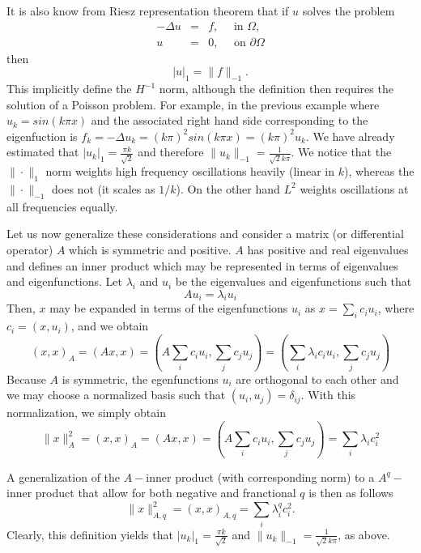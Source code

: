 It is also know from Riesz representation theorem that if
$u$ solves the problem
\begin{eqnarray*}
-\Delta u &=& f, \quad \mbox{ in } \Omega, \\   
        u &=& 0, \quad \mbox{ on } \partial \Omega  
\end{eqnarray*}
then 
\begin{equation}
\label{riesz}
|u|_1 = \|f\|_{-1} . 
\end{equation}
This implicitly define the $H^{-1}$ norm, although
the definition then requires the solution of a Poisson problem.   
For example, in the previous example where
$u_k = sin(k\pi x)$
and the associated right hand side corresponding to the eigenfuction is  $f_k = -\Delta u_k = (k \pi)^2 sin(k\pi x) = (k \pi)^2 u_k $. 
We  have already estimated  
that $|u_k|_1 = \frac{\pi k}{\sqrt{2}}$ and therefore 
$\|u_k\|_{-1} =  \frac{1}{\sqrt{2} k \pi }$.  
We notice that the $\|\cdot\|_1$ norm weights high frequency oscillations heavily (linear in $k$), whereas
the $\|\cdot\|_{-1}$ does not (it scales as $1/k$). On the other hand $L^2$ weights oscillations at all frequencies
equally.   \label{sinkpnorms} 

Let us now generalize these considerations and  consider a matrix 
(or differential operator) $A$ which is
symmetric and positive. $A$ has positive and real
eigenvalues and defines an inner product which may
be represented in terms of eigenvalues and eigenfunctions. Let     
$\lambda_i$ and $u_i$ be the eigenvalues and eigenfunctions
such that 
\[
A u_i = \lambda_i u_i  
\]
Then, $x$ may be expanded in terms of the eigenfunctions $u_i$ as
$x=\sum_i c_i u_i$, where $c_i = (x, u_i)$,  and we obtain 
\[
(x,x)_A = (A x, x) = (A \sum_i c_i u_i  , \sum_j c_j u_j)     
= (\sum_i \lambda_i  c_i u_i  , \sum_j c_j u_j)  
\]
Because $A$ is symmetric, the egenfunctions $u_i$  are orthogonal to each other
and we may choose a normalized basis such that $(u_i, u_j) =  \delta_{ij}$.
With this normalization, we simply obtain
\[
\|x\|_A^2 = (x,x)_A = (A x, x) = (A \sum_i c_i u_i  , \sum_j c_j u_j)     
= \sum_i \lambda_i  c_i^2    
\]


A generalization of the $A-$inner product (with corresponding norm) to 
a $A^q-$inner product that allow for both negative and franctional $q$  
is then as follows
\begin{equation}
\label{qnorm}
\|x\|_{A,q}^2 =  (x,x)_{A,q} =  \sum_i \lambda^q_i c_i^2.     
\end{equation}
Clearly, this definition yields 
that $|u_k|_1 = \frac{\pi k}{\sqrt{2}}$ and 
$\|u_k\|_{-1} = \frac{1}{\sqrt{2} k \pi }$, as above.  

